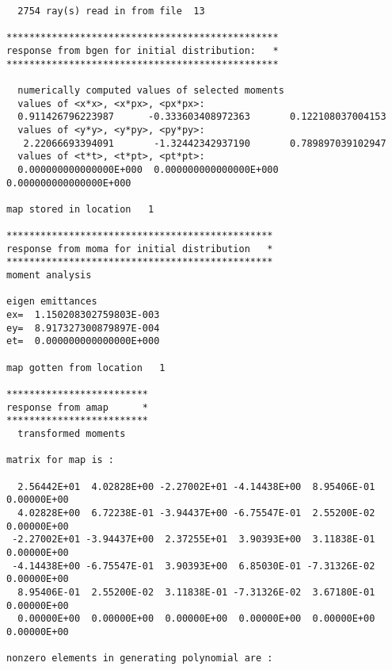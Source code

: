 \begin{footnotesize}
\begin{verbatim}
  2754 ray(s) read in from file  13

************************************************
response from bgen for initial distribution:   *
************************************************

  numerically computed values of selected moments
  values of <x*x>, <x*px>, <px*px>:
  0.911426796223987      -0.333603408972363       0.122108037004153
  values of <y*y>, <y*py>, <py*py>:
   2.22066693394091       -1.32442342937190       0.789897039102947
  values of <t*t>, <t*pt>, <pt*pt>:
  0.000000000000000E+000  0.000000000000000E+000  0.000000000000000E+000

map stored in location   1

***********************************************
response from moma for initial distribution   *
***********************************************
moment analysis

eigen emittances
ex=  1.150208302759803E-003
ey=  8.917327300879897E-004
et=  0.000000000000000E+000

map gotten from location   1

*************************
response from amap      *
*************************
  transformed moments

matrix for map is :

  2.56442E+01  4.02828E+00 -2.27002E+01 -4.14438E+00  8.95406E-01  0.00000E+00
  4.02828E+00  6.72238E-01 -3.94437E+00 -6.75547E-01  2.55200E-02  0.00000E+00
 -2.27002E+01 -3.94437E+00  2.37255E+01  3.90393E+00  3.11838E-01  0.00000E+00
 -4.14438E+00 -6.75547E-01  3.90393E+00  6.85030E-01 -7.31326E-02  0.00000E+00
  8.95406E-01  2.55200E-02  3.11838E-01 -7.31326E-02  3.67180E-01  0.00000E+00
  0.00000E+00  0.00000E+00  0.00000E+00  0.00000E+00  0.00000E+00  0.00000E+00

nonzero elements in generating polynomial are :


\end{verbatim}
\end{footnotesize}
